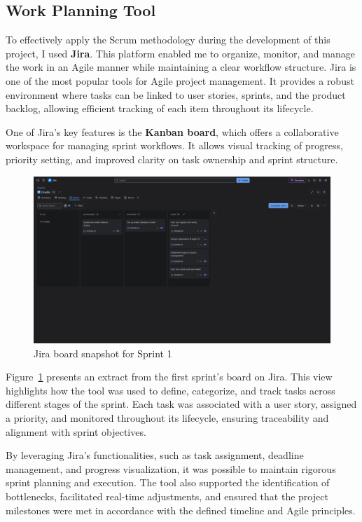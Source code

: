 \subsection{Work Planning Tool}

To effectively apply the Scrum methodology during the development of this project, I used \textbf{Jira}. This platform enabled me to organize, monitor, and manage the work in an Agile manner while maintaining a clear workflow structure. Jira is one of the most popular tools for Agile project management. It provides a robust environment where tasks can be linked to user stories, sprints, and the product backlog, allowing efficient tracking of each item throughout its lifecycle.

One of Jira’s key features is the \textbf{Kanban board}, which offers a collaborative workspace for managing sprint workflows. It allows visual tracking of progress, priority setting, and improved clarity on task ownership and sprint structure.

\begin{figure}[H]
  \centering
  \includegraphics[width=\textwidth]{images/jira_board_sprint_1.png}
  \caption{Jira board snapshot for Sprint 1}
  \label{fig:jira_board_sprint1}
\end{figure}

Figure~\ref{fig:jira_board_sprint1} presents an extract from the first sprint’s board on Jira. This view highlights how the tool was used to define, categorize, and track tasks across different stages of the sprint. Each task was associated with a user story, assigned a priority, and monitored throughout its lifecycle, ensuring traceability and alignment with sprint objectives.

By leveraging Jira’s functionalities, such as task assignment, deadline management, and progress visualization, it was possible to maintain rigorous sprint planning and execution. The tool also supported the identification of bottlenecks, facilitated real-time adjustments, and ensured that the project milestones were met in accordance with the defined timeline and Agile principles.

